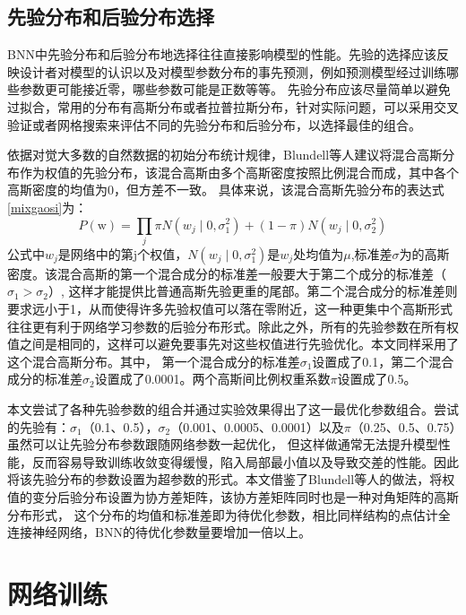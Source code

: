 \subsection{先验分布和后验分布选择}
BNN中先验分布和后验分布地选择往往直接影响模型的性能。先验的选择应该反映设计者对模型的认识以及对模型参数分布的事先预测，例如预测模型经过训练哪些参数更可能接近零，哪些参数可能是正数等等。
先验分布应该尽量简单以避免过拟合，常用的分布有高斯分布或者拉普拉斯分布，针对实际问题，可以采用交叉验证或者网格搜索来评估不同的先验分布和后验分布，以选择最佳的组合。

依据对觉大多数的自然数据的初始分布统计规律，Blundell等人\cite{blundell2015weight}建议将混合高斯分布作为权值的先验分布，该混合高斯由多个高斯密度按照比例混合而成，其中各个高斯密度的均值为0，但方差不一致。
具体来说，该混合高斯先验分布的表达式\eqref{mixgaosi}为：
\begin{equation}
	\label{mixgaosi}
	P(\mathrm{w})=\prod_j \pi N\left(w_j \mid 0, \sigma_1^2\right)+(1-\pi) N\left(w_j \mid 0, \sigma_2^2\right)
\end{equation}
公式中$w_j$是网络中的第j个权值，$N\left(w_j \mid 0, \sigma_1^2\right)$是$w_j$处均值为$\mu$,标准差$\sigma$为的高斯密度。该混合高斯的第一个混合成分的标准差一般要大于第二个成分的标准差（$\sigma_1 > \sigma_2$）,
这样才能提供比普通高斯先验更重的尾部。第二个混合成分的标准差则要求远小于1，从而使得许多先验权值可以落在零附近，这一种更集中个高斯形式往往更有利于网络学习参数的后验分布形式。除此之外，所有的先验参数在所有权值之间是相同的，这样可以避免要事先对这些权值进行先验优化。本文同样采用了这个混合高斯分布。其中，
第一个混合成分的标准差$\sigma_1$设置成了0.1，第二个混合成分的标准差$\sigma_2$设置成了0.0001。两个高斯间比例权重系数$\pi$设置成了0.5。

本文尝试了各种先验参数的组合并通过实验效果得出了这一最优化参数组合。尝试的先验有：$\sigma_1$（0.1、0.5），$\sigma_2$（0.001、0.0005、0.0001）以及$\pi$（0.25、0.5、0.75）虽然可以让先验分布参数跟随网络参数一起优化，
但这样做通常无法提升模型性能，反而容易导致训练收敛变得缓慢，陷入局部最小值以及导致交差的性能。因此将该先验分布的参数设置为超参数的形式。本文借鉴了Blundell等人的做法，将权值的变分后验分布设置为协方差矩阵，该协方差矩阵同时也是一种对角矩阵的高斯分布形式，
这个分布的均值和标准差即为待优化参数，相比同样结构的点估计全连接神经网络，BNN的待优化参数量要增加一倍以上。

\section{网络训练}

